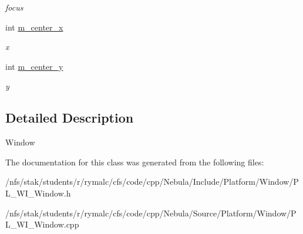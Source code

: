 \begin{DoxyCompactItemize}
\begin{DoxyCompactList}\small\item\em focus \item\end{DoxyCompactList}\item 
\hypertarget{classPlatform_1_1Window_1_1Window_ad95dd62105f2c93a2cca866832fc8207}{
int \hyperlink{classPlatform_1_1Window_1_1Window_ad95dd62105f2c93a2cca866832fc8207}{m\_\-center\_\-x}}
\label{classPlatform_1_1Window_1_1Window_ad95dd62105f2c93a2cca866832fc8207}

\begin{DoxyCompactList}\small\item\em x \item\end{DoxyCompactList}\item 
\hypertarget{classPlatform_1_1Window_1_1Window_a40eabc8f0c4db01bc3804fa7c24147ee}{
int \hyperlink{classPlatform_1_1Window_1_1Window_a40eabc8f0c4db01bc3804fa7c24147ee}{m\_\-center\_\-y}}
\label{classPlatform_1_1Window_1_1Window_a40eabc8f0c4db01bc3804fa7c24147ee}

\begin{DoxyCompactList}\small\item\em y \item\end{DoxyCompactList}\end{DoxyCompactItemize}


\subsection{Detailed Description}
Window 

The documentation for this class was generated from the following files:\begin{DoxyCompactItemize}
\item 
/nfs/stak/students/r/rymalc/cfs/code/cpp/Nebula/Include/Platform/Window/PL\_\-WI\_\-Window.h\item 
/nfs/stak/students/r/rymalc/cfs/code/cpp/Nebula/Source/Platform/Window/PL\_\-WI\_\-Window.cpp\end{DoxyCompactItemize}
